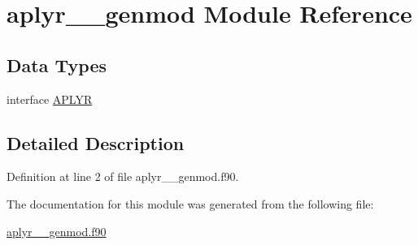 \hypertarget{classaplyr____genmod}{\section{aplyr\+\_\+\+\_\+genmod Module Reference}
\label{classaplyr____genmod}
}
\subsection*{Data Types}
\begin{DoxyCompactItemize}
\item 
interface \hyperlink{interfaceaplyr____genmod_1_1APLYR}{A\+P\+L\+Y\+R}
\end{DoxyCompactItemize}


\subsection{Detailed Description}


Definition at line 2 of file aplyr\+\_\+\+\_\+genmod.\+f90.



The documentation for this module was generated from the following file\+:\begin{DoxyCompactItemize}
\item 
\hyperlink{aplyr____genmod_8f90}{aplyr\+\_\+\+\_\+genmod.\+f90}\end{DoxyCompactItemize}
